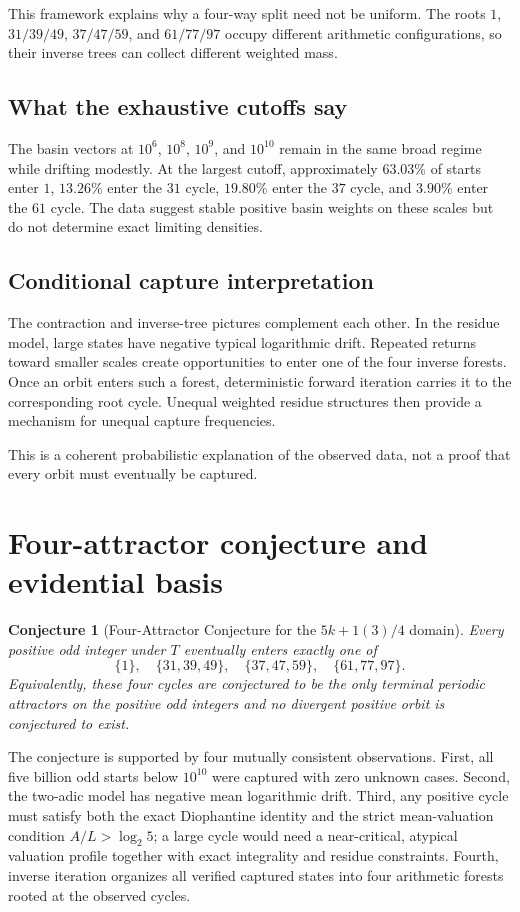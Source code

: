 \documentclass[11pt]{article}
\newtheorem{conjecture}{Conjecture}
\begin{document}
This framework explains why a four-way split need not be uniform. The roots $1$, $31/39/49$, $37/47/59$, and $61/77/97$ occupy different arithmetic configurations, so their inverse trees can collect different weighted mass.

\subsection{What the exhaustive cutoffs say}
The basin vectors at $10^6$, $10^8$, $10^9$, and $10^{10}$ remain in the same broad regime while drifting modestly. At the largest cutoff, approximately $63.03\%$ of starts enter $1$, $13.26\%$ enter the $31$ cycle, $19.80\%$ enter the $37$ cycle, and $3.90\%$ enter the $61$ cycle. The data suggest stable positive basin weights on these scales but do not determine exact limiting densities.

\subsection{Conditional capture interpretation}
The contraction and inverse-tree pictures complement each other. In the residue model, large states have negative typical logarithmic drift. Repeated returns toward smaller scales create opportunities to enter one of the four inverse forests. Once an orbit enters such a forest, deterministic forward iteration carries it to the corresponding root cycle. Unequal weighted residue structures then provide a mechanism for unequal capture frequencies.

This is a coherent probabilistic explanation of the observed data, not a proof that every orbit must eventually be captured.

\section{Four-attractor conjecture and evidential basis}
\begin{conjecture}[Four-Attractor Conjecture for the $5k+1(3)/4$ domain]
Every positive odd integer under $T$ eventually enters exactly one of
\[
\{1\},\quad\{31,39,49\},\quad\{37,47,59\},\quad\{61,77,97\}.
\]
Equivalently, these four cycles are conjectured to be the only terminal periodic attractors on the positive odd integers and no divergent positive orbit is conjectured to exist.
\end{conjecture}

The conjecture is supported by four mutually consistent observations. First, all five billion odd starts below $10^{10}$ were captured with zero unknown cases. Second, the two-adic model has negative mean logarithmic drift. Third, any positive cycle must satisfy both the exact Diophantine identity and the strict mean-valuation condition $A/L>\log_2 5$; a large cycle would need a near-critical, atypical valuation profile together with exact integrality and residue constraints. Fourth, inverse iteration organizes all verified captured states into four arithmetic forests rooted at the observed cycles.
\end{document}
